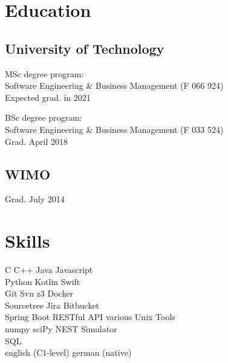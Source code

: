 \documentclass[]{resume}
\begin{document}
\begin{minipage}[t]{0.33\textwidth} 
\section{Education} 

	\subsection{University of Technology}
		MSc degree program: \\
		Software Engineering \& Business Management (F 066 924)\\
		Expected grad. in 2021
		\sectionsep

		BSc degree program: \\
		Software Engineering \& Business Management (F 033 524)\\
		Grad. April 2018
	\sectionsep

	\subsection{WIMO}
		Grad. July 2014
	\sectionsep

\section{Skills}
	C \textbullet{} C++ \textbullet{} Java \textbullet{} Javascript \\ Python \textbullet{} Kotlin \textbullet{} Swift \\ \sectionsep 
	Git \textbullet{} Svn \textbullet{} z3 \textbullet{} Docker \\ Sourcetree \textbullet{} Jira \textbullet{} Bitbucket \\ Spring Boot \textbullet{} RESTful API \textbullet{} 
	various Unix Tools \\ \sectionsep 
	numpy \textbullet{} sciPy \textbullet{} NEST Simulator \\ \sectionsep 
	SQL\\ \sectionsep 
	english (C1-level) \textbullet{} german (native)
	
\end{minipage}\quad %
\end{document}
